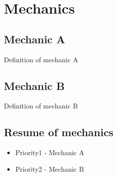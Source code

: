 %
%
%

\section{\projectname Mechanics}


\subsection{Mechanic A}
Definition of mechanic A

\subsection{Mechanic B}
Definition of mechanic B


\subsection{Resume of mechanics}

\begin{itemize}

\item Priority1 - Mechanic A

\item Priority2 - Mechanic B

\end{itemize}


